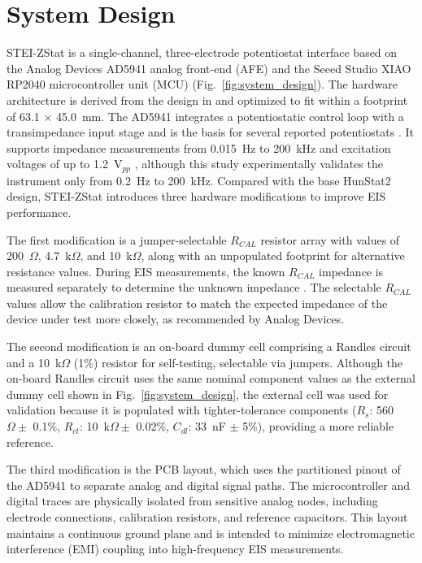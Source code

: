 \section{System Design}
STEI-ZStat is a single-channel, three-electrode potentiostat interface based on the Analog Devices AD5941 analog front-end (AFE) and the Seeed Studio XIAO RP2040 microcontroller unit (MCU) (Fig.~\ref{fig:system_design}). The hardware architecture is derived from the design in \cite{vamos2025hunstat2} and optimized to fit within a footprint of 63.1 $\times$ 45.0~mm. The AD5941 integrates a potentiostatic control loop with a transimpedance input stage and is the basis for several reported potentiostats \cite{bautista2025helpstat, bill2023electrochemical, vamos2025hunstat2}. It supports impedance measurements from 0.015~Hz to 200~kHz and excitation voltages of up to 1.2~V$_{pp}$ \cite{devices2024ad5940}, although this study experimentally validates the instrument only from 0.2~Hz to 200~kHz. Compared with the base HunStat2 design, STEI-ZStat introduces three hardware modifications to improve EIS performance.

The first modification is a jumper-selectable $R_{CAL}$ resistor array with values of 200~$\Omega$, 4.7~k$\Omega$, and 10~k$\Omega$, along with an unpopulated footprint for alternative resistance values. During EIS measurements, the known $R_{CAL}$ impedance is measured separately to determine the unknown impedance \cite{ad5940_eis_github}. The selectable $R_{CAL}$ values allow the calibration resistor to match the expected impedance of the device under test more closely, as recommended by Analog Devices.

The second modification is an on-board dummy cell comprising a Randles circuit and a 10~k$\Omega$ (1\%) resistor for self-testing, selectable via jumpers. Although the on-board Randles circuit uses the same nominal component values as the external dummy cell shown in Fig.~\ref{fig:system_design}, the external cell was used for validation because it is populated with tighter-tolerance components ($R_s$: 560~$\Omega \pm$ 0.1\%, $R_{ct}$: 10~k$\Omega \pm$ 0.02\%, $C_{dl}$: 33~nF $\pm$ 5\%), providing a more reliable reference.

The third modification is the PCB layout, which uses the partitioned pinout of the AD5941 to separate analog and digital signal paths. The microcontroller and digital traces are physically isolated from sensitive analog nodes, including electrode connections, calibration resistors, and reference capacitors. This layout maintains a continuous ground plane and is intended to minimize electromagnetic interference (EMI) coupling into high-frequency EIS measurements.

